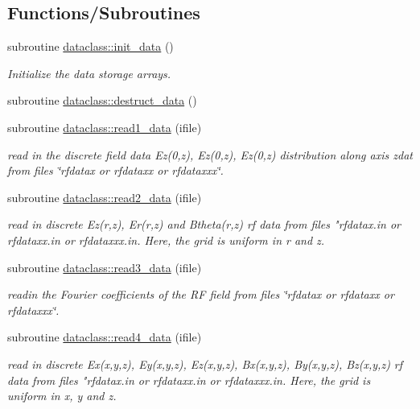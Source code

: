 \subsection*{Functions/\+Subroutines}
\begin{DoxyCompactItemize}
\item 
subroutine \mbox{\hyperlink{namespacedataclass_a474ffe5e76484d63015aaf6255c27294}{dataclass\+::init\+\_\+data}} ()
\begin{DoxyCompactList}\small\item\em Initialize the data storage arrays. \end{DoxyCompactList}\item 
subroutine \mbox{\hyperlink{namespacedataclass_ac5b255034c2a115b6740378b4d1e630e}{dataclass\+::destruct\+\_\+data}} ()
\item 
subroutine \mbox{\hyperlink{namespacedataclass_a6733af7e3067d69140c61e2b4580a70b}{dataclass\+::read1\+\_\+data}} (ifile)
\begin{DoxyCompactList}\small\item\em read in the discrete field data Ez(0,z), Ez\textquotesingle{}(0,z), Ez\textquotesingle{}\textquotesingle{}(0,z) distribution along axis zdat from files \char`\"{}rfdatax or rfdataxx 
 or rfdataxxx\char`\"{}. \end{DoxyCompactList}\item 
subroutine \mbox{\hyperlink{namespacedataclass_abf0c8413e040d7ea8c0bc5df73c9ef96}{dataclass\+::read2\+\_\+data}} (ifile)
\begin{DoxyCompactList}\small\item\em read in discrete Ez(r,z), Er(r,z) and Btheta(r,z) rf data from files "rfdatax.\+in or rfdataxx.\+in or rfdataxxx.\+in. Here, the grid is uniform in r and z. \end{DoxyCompactList}\item 
subroutine \mbox{\hyperlink{namespacedataclass_a39afae6095340e01362de7d4876aee60}{dataclass\+::read3\+\_\+data}} (ifile)
\begin{DoxyCompactList}\small\item\em readin the Fourier coefficients of the RF field from files \char`\"{}rfdatax or rfdataxx or rfdataxxx\char`\"{}. \end{DoxyCompactList}\item 
subroutine \mbox{\hyperlink{namespacedataclass_a2ef1f00ff4295094270a70c5d3763019}{dataclass\+::read4\+\_\+data}} (ifile)
\begin{DoxyCompactList}\small\item\em read in discrete Ex(x,y,z), Ey(x,y,z), Ez(x,y,z), Bx(x,y,z), By(x,y,z), Bz(x,y,z) rf data from files "rfdatax.\+in or rfdataxx.\+in or rfdataxxx.\+in. Here, the grid is uniform in x, y and z. \end{DoxyCompactList}\item 

\end{DoxyCompactItemize}
